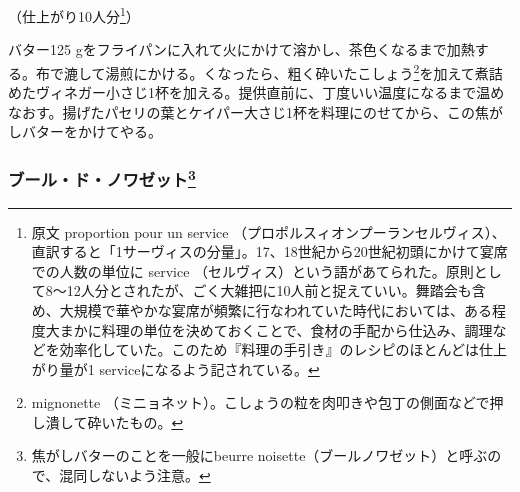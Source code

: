 \begin{recette}

 

（仕上がり10人分\footnote{原文 proportion pour un service
  （プロポルスィオンプーランセルヴィス）、直訳すると「1サーヴィスの分量」。17、18世紀から20世紀初頭にかけて宴席での人数の単位に
  service
  （セルヴィス）という語があてられた。原則として8〜12人分とされたが、ごく大雑把に10人前と捉えていい。舞踏会も含め、大規模で華やかな宴席が頻繁に行なわれていた時代においては、ある程度大まかに料理の単位を決めておくことで、食材の手配から仕込み、調理などを効率化していた。このため『料理の手引き』のレシピのほとんどは仕上がり量が1
  serviceになるよう記されている。}）

バター125
gをフライパンに入れて火にかけて溶かし、茶色くなるまで加熱する。布で漉して湯煎にかける。くなったら、粗く砕いたこしょう\footnote{mignonette
  （ミニョネット）。こしょうの粒を肉叩きや包丁の側面などで押し潰して砕いたもの。}を加えて煮詰めたヴィネガー小さじ1杯を加える。提供直前に、丁度いい温度になるまで温めなおす。揚げたパセリの葉とケイパー大さじ1杯を料理にのせてから、この焦がしバターをかけてやる。

\hypertarget{beurre-de-noisette}{%
\subsubsection[ブール・ド・ノワゼット]{\texorpdfstring{ブール・ド・ノワゼット\footnote{焦がしバターのことを一般にbeurre
  noisette（ブールノワゼット）と呼ぶので、混同しないよう注意。}}{ブール・ド・ノワゼット}}\label{beurre-de-noisette}}




\end{recette}
